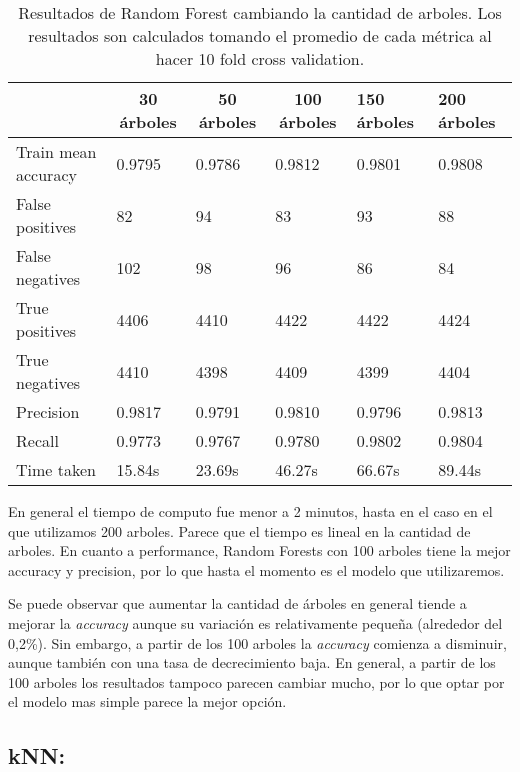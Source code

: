 \documentclass[10pt,a4paper]{article}
\begin{document}
\begin{table}[H]
	\centering
	\begin{tabular}{|l|l|l|l|l|l|}
		\hline
		\multicolumn{1}{|c|}{\textbf{}} & \multicolumn{1}{c|}{\textbf{30 árboles}} & \multicolumn{1}{c|}{\textbf{50 árboles}} & \multicolumn{1}{c|}{\textbf{100 árboles}} & \textbf{150 árboles} & \textbf{200 árboles} \\
\hline
Train mean accuracy & 0.9795 & 0.9786 & 0.9812 & 0.9801 & 0.9808\\ \hline
False positives     & 82 & 94 & 83 & 93 & 88\\ \hline
False negatives     & 102 & 98 & 96 & 86 & 84\\ \hline
True positives      & 4406 & 4410 & 4422 & 4422 & 4424\\ \hline
True negatives      & 4410 & 4398 & 4409 & 4399 & 4404       \\ \hline
Precision           & 0.9817 & 0.9791 & 0.9810 & 0.9796 & 0.9813 \\ \hline
Recall              & 0.9773 & 0.9767 & 0.9780 & 0.9802 & 0.9804 \\ \hline
Time taken          & 15.84s & 23.69s & 46.27s & 66.67s & 89.44s \\ \hline
	\end{tabular}
	\caption{Resultados de Random Forest cambiando la cantidad de arboles. Los resultados son calculados tomando el promedio de cada métrica al hacer 10 fold cross validation.}
	\label{rf}
\end{table}

En general el tiempo de computo fue menor a 2 minutos, hasta en el caso en el que utilizamos 200 arboles. Parece que el tiempo es lineal en la cantidad de arboles. En cuanto a performance, Random Forests con 100 arboles tiene la mejor accuracy y precision, por lo que hasta el momento es el modelo que utilizaremos.

Se puede observar que aumentar la cantidad de árboles en general tiende a mejorar la \textit{accuracy} aunque su variación es relativamente pequeña (alrededor del 0,2\%). Sin embargo, a partir de los 100 arboles la \textit{accuracy} comienza a disminuir, aunque también con una tasa de decrecimiento baja. En general, a partir de los 100 arboles los resultados tampoco parecen cambiar mucho, por lo que optar por el modelo mas simple parece la mejor opción.

\pagebreak

\subsection{kNN:}
\end{document}
